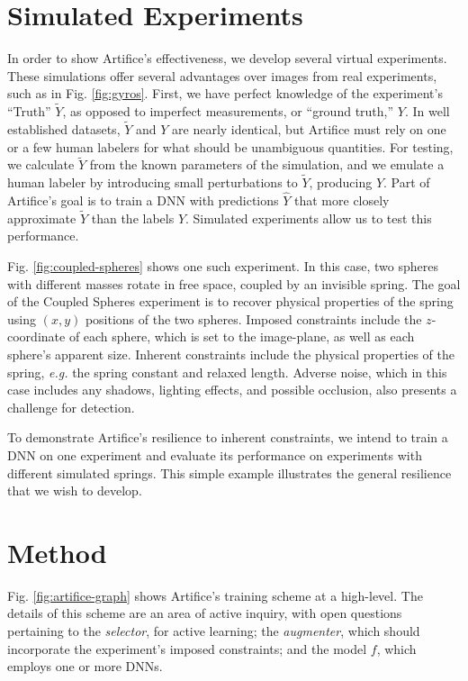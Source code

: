 \documentclass[twocolumn, 10pt]{asme2ej} %
\begin{document}
\section{Simulated Experiments}
\label{sec:simulated-experiments}

In order to show Artifice's effectiveness, we develop several virtual
experiments. These simulations offer several advantages over images from real
experiments, such as in Fig. \ref{fig:gyros}. First, we have perfect knowledge
of the experiment's ``Truth'' $\tilde{Y}$, as opposed to imperfect measurements,
or ``ground truth,'' $Y$. In well established datasets, $\tilde{Y}$ and $Y$ are
nearly identical, but Artifice must rely on one or a few human labelers for what
should be unambiguous quantities. For testing, we calculate $\tilde{Y}$ from the
known parameters of the simulation, and we emulate a human labeler by
introducing small perturbations to $\tilde{Y}$, producing $Y$. Part of
Artifice's goal is to train a DNN with predictions $\hat{Y}$ that more closely
approximate $\tilde{Y}$ than the labels $Y$. Simulated experiments allow us to
test this performance.

Fig. \ref{fig:coupled-spheres} shows one such experiment. In this case, two
spheres with different masses rotate in free space, coupled by an invisible
spring. The goal of the Coupled Spheres experiment is to recover physical
properties of the spring using $(x,y)$ positions of the two spheres. Imposed
constraints include the $z$-coordinate of each sphere, which is set to the
image-plane, as well as each sphere's apparent size. Inherent constraints
include the physical properties of the spring, \textit{e.g.} the spring constant
and relaxed length. Adverse noise, which in this case includes any shadows,
lighting effects, and possible occlusion, also presents a challenge for
detection.

To demonstrate Artifice's resilience to inherent constraints, we intend to train
a DNN on one experiment and evaluate its performance on experiments with
different simulated springs. This simple example illustrates the general
resilience that we wish to develop.

\section{Method}
\label{sec:method}

Fig. \ref{fig:artifice-graph} shows Artifice's training scheme at a
high-level. The details of this scheme are an area of active inquiry, with open
questions pertaining to the \emph{selector}, for active learning; the
\emph{augmenter}, which should incorporate the experiment's imposed constraints;
and the model $f$, which employs one or more DNNs.
\end{document}
